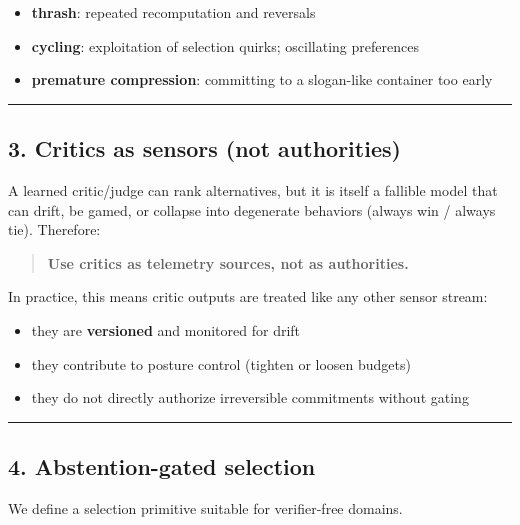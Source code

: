 \documentclass[11pt]{article}
\providecommand{\tightlist}{%
  \setlength{\itemsep}{0pt}\setlength{\parskip}{0pt}}
\begin{document}
\begin{itemize}
\tightlist
\item \textbf{thrash}: repeated recomputation and reversals
\item \textbf{cycling}: exploitation of selection quirks; oscillating preferences
\item \textbf{premature compression}: committing to a slogan-like container too early
\end{itemize}

\begin{center}\rule{0.5\linewidth}{0.5pt}\end{center}

\hypertarget{critics-as-sensors}{%
\subsection{3. Critics as sensors (not authorities)}\label{critics-as-sensors}}

A learned critic/judge can rank alternatives, but it is itself a fallible model that can drift, be gamed, or collapse into degenerate behaviors (always win / always tie). Therefore:

\begin{quote}
\textbf{Use critics as telemetry sources, not as authorities.}
\end{quote}

In practice, this means critic outputs are treated like any other sensor stream:

\begin{itemize}
\tightlist
\item they are \textbf{versioned} and monitored for drift
\item they contribute to posture control (tighten or loosen budgets)
\item they do not directly authorize irreversible commitments without gating
\end{itemize}

\begin{center}\rule{0.5\linewidth}{0.5pt}\end{center}

\hypertarget{abstention-gated-selection}{%
\subsection{4. Abstention-gated selection}\label{abstention-gated-selection}}

We define a selection primitive suitable for verifier-free domains.
\end{document}
